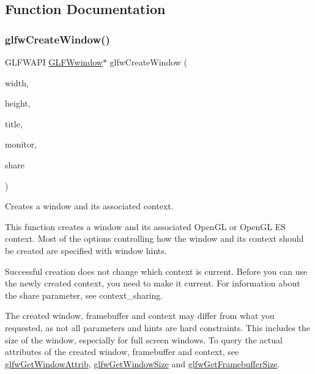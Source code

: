 \subsection{Function Documentation}
\mbox{\label{group__window_ga680a02abe0e4494b6759d5703240713e}} 
\subsubsection{\texorpdfstring{glfw\+Create\+Window()}{glfwCreateWindow()}}
{\footnotesize\ttfamily G\+L\+F\+W\+A\+PI \hyperlink{group__window_ga3c96d80d363e67d13a41b5d1821f3242}{G\+L\+F\+Wwindow}$\ast$ glfw\+Create\+Window (\begin{DoxyParamCaption}\item[{int}]{width,  }\item[{int}]{height,  }\item[{const char $\ast$}]{title,  }\item[{\hyperlink{group__monitor_ga8d9efd1cde9426692c73fe40437d0ae3}{G\+L\+F\+Wmonitor} $\ast$}]{monitor,  }\item[{\hyperlink{group__window_ga3c96d80d363e67d13a41b5d1821f3242}{G\+L\+F\+Wwindow} $\ast$}]{share }\end{DoxyParamCaption})}



Creates a window and its associated context. 

This function creates a window and its associated Open\+GL or Open\+GL ES context. Most of the options controlling how the window and its context should be created are specified with window hints.

Successful creation does not change which context is current. Before you can use the newly created context, you need to make it current. For information about the {\ttfamily share} parameter, see context\+\_\+sharing.

The created window, framebuffer and context may differ from what you requested, as not all parameters and hints are hard constraints. This includes the size of the window, especially for full screen windows. To query the actual attributes of the created window, framebuffer and context, see \hyperlink{group__window_ga1bb0c7e100418e284dbb800789c63d40}{glfw\+Get\+Window\+Attrib}, \hyperlink{group__window_ga7feb769ebb3f3d21579b5a3fb07be76e}{glfw\+Get\+Window\+Size} and \hyperlink{group__window_gaf7d17f3534b4b6dc9a6f905e3a240b7e}{glfw\+Get\+Framebuffer\+Size}.

